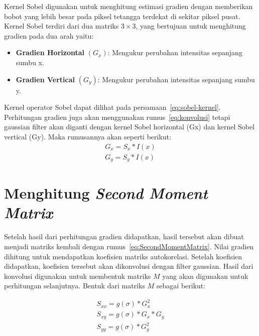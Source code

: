     Kernel Sobel digunakan untuk menghitung estimasi gradien dengan memberikan bobot yang lebih besar pada piksel tetangga terdekat di sekitar piksel pusat.
Kernel Sobel terdiri dari dua matriks \(3 \times 3\), yang bertujuan untuk menghitung gradien pada dua arah yaitu:
 \begin{itemize}
    \item \textbf{Gradien Horizontal} \((G_{x})\): Mengukur perubahan intensitas sepanjang sumbu x.
    \item \textbf{Gradien Vertical} \((G_{y})\): Mengukur perubahan intensitas sepanjang sumbu y.
\end{itemize}Kernel operator Sobel dapat dilihat pada persamaan~\eqref{eq:sobel-kernel}. 
Perhitungan gradien juga akan menggunakan rumus~\eqref{eq:konvolusi} tetapi gaussian filter akan diganti dengan kernel Sobel horizontal (Gx) dan kernel Sobel vertical (Gy).
Maka rumusannya akan seperti berikut:
\begin{equation}
    \begin{aligned}
        G_{x} = S_{x} * I(x)\\ G_{y} = S_{y} * I(x)
    \end{aligned}
\end{equation}


\section{Menghitung \emph{Second Moment Matrix}}
    Setelah hasil dari perhitungan gradien didapatkan, hasil tersebut akan dibuat menjadi matriks kembali dengan rumus~\eqref{eq:SecondMomentMatrix}. Nilai gradien dihitung untuk mendapatkan koefisien matriks autokorelasi. Setelah koefisien didapatkan, koefisien tersebut akan dikonvolusi dengan filter gaussian.
Hasil dari konvolusi digunakan untuk membentuk matriks \(M\) yang akan digunakan untuk perhitungan selanjutnya. Bentuk dari matriks \(M\) sebagai berikut:

\begin{equation}
    \begin{aligned}
        S_{xx} = g(\sigma) * G_{x}^2 \\
        S_{xy} = g(\sigma) * G_{x} * G_{y} \\
        S_{yy} = g(\sigma) * G_{y}^2
    \end{aligned}
\end{equation}

